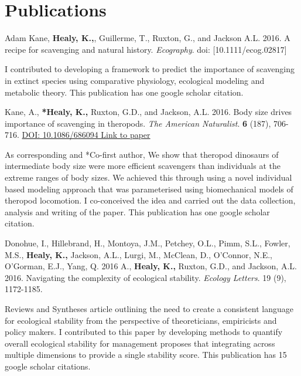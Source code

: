 \documentclass[10pt,a4paper]{article}
\begin{document}
\bigskip

\section{Publications}
\begin{flushleft}

\setlength{\parindent}{0mm} Adam Kane, \textbf{Healy, K.,}, Guillerme, T., Ruxton, G., and Jackson A.L. 2016. A recipe for scavenging and natural history. \textit{Ecography}. doi: [10.1111/ecog.02817]
\smallskip
\par{\fontsize{10.5}{10} I contributed to developing a framework to predict the importance of scavenging in extinct species using comparative physiology, ecological modeling and metabolic theory. This publication has one google scholar citation.}

\bigskip

\setlength{\parindent}{0mm}Kane, A., \textbf{*Healy, K.,} Ruxton, G.D., and Jackson, A.L. 2016. Body size drives importance of scavenging in theropods. \textit{The American Naturalist}. \textbf{6} (187), 706-716. \href{https://www.researchgate.net/profile/Kevin_Healy/publication/301279301_Body_Size_as_a_Driver_of_Scavenging_in_Theropod_Dinosaurs/links/570f8b2a08ae38897ba19c35.pdf.}{DOI: 10.1086/686094 Link to paper}
\smallskip
\par{\fontsize{10.5}{10} As corresponding and *Co-first author, We show that theropod dinosaurs of intermediate body size were more efficient scavengers than individuals at the extreme ranges of body sizes. We achieved this through using a novel individual based modeling approach that was parameterised using biomechanical models of theropod locomotion. I co-conceived the idea and carried out the data collection, analysis and writing of the paper. This publication has one google scholar citation.}

\bigskip

\setlength{\parindent}{0mm}Donohue, I., Hillebrand, H., Montoya, J.M., Petchey, O.L., Pimm, S.L., Fowler, M.S., \textbf{Healy, K.,} Jackson, A.L., Lurgi, M., McClean, D., O'Connor, N.E., O'Gorman, E.J., Yang, Q. 2016
 A., \textbf{Healy, K.,} Ruxton, G.D., and Jackson, A.L. 2016. Navigating the complexity of ecological stability. \textit{Ecology Letters}. 19 (9), 1172-1185.
\smallskip
\par{\fontsize{10.5}{10} Reviews and Syntheses article outlining the need to create a consistent language for ecological stability from the perspective of theoreticians, empiricists and policy makers. I contributed to this paper by developing methods to quantify overall ecological stability for management proposes that integrating across multiple dimensions to provide a single stability score. This publication has 15 google scholar citations.}


\end{flushleft}
\end{document}
